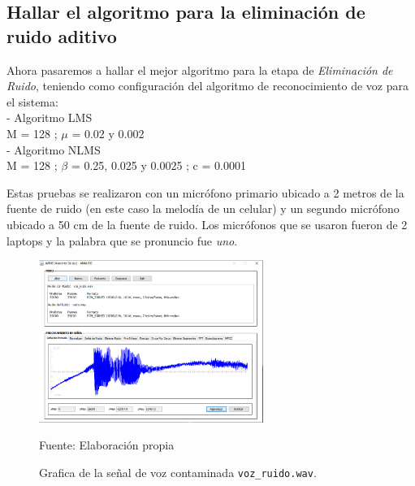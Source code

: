 \subsection{Hallar el algoritmo para la eliminación de ruido aditivo}
Ahora pasaremos a hallar el mejor algoritmo para la etapa de \textit{Eliminación de Ruido}, teniendo como configuración del algoritmo de reconocimiento de voz para el sistema: \\
- Algoritmo LMS\\
\hspace*{1cm} M = 128 ; \qquad $\mu$ = 0.02 y 0.002\\
- Algoritmo NLMS \\
\hspace*{1cm} M = 128 ; \qquad $\beta$ = 0.25, 0.025 y 0.0025 ; \qquad c = 0.0001

\vskip 0.5cm
Estas pruebas se realizaron con un micrófono primario ubicado a 2 metros de la fuente de ruido (en este caso la melodía de un celular) y un segundo micrófono ubicado a 50 cm de la fuente de ruido. Los micrófonos que se usaron fueron de 2 laptops y la palabra que se pronuncio fue \textit{uno}.

\begin{figure}[H]
\begin{center}
\includegraphics[width=0.65\textwidth]{Imagenes/Cap3/image077}
\end{center}
\begin{center}
\vskip -0.5cm
\caption{\small{Grafica de la señal de voz contaminada \texttt{voz\_ruido.wav}.}}
\label{fig:figura3.77}
{\small{Fuente: Elaboración propia}}
\end{center}
\end{figure}

\vskip -1cm

